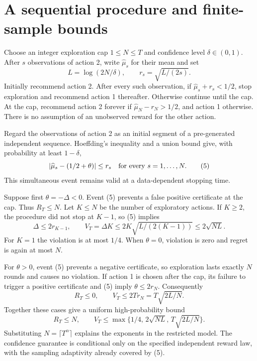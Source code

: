 \documentclass[11pt]{article}
\begin{document}
\section*{A sequential procedure and finite-sample bounds}
Choose an integer exploration cap $1\leq N\leq T$ and confidence level
$\delta\in(0,1)$. After $s$ observations of action 2, write
$\widehat\mu_s$ for their mean and set
\[
 L=\log(2N/\delta),\qquad r_s=\sqrt{L/(2s)}.
\]
Initially recommend action 2. After every such observation, if
$\widehat\mu_s+r_s<1/2$, stop exploration and recommend action 1
thereafter. Otherwise continue until the cap. At the cap, recommend
action 2 forever if $\widehat\mu_N-r_N>1/2$, and action 1 otherwise.
There is no assumption of an unobserved reward for the other action.

Regard the observations of action 2 as an initial segment of a
pre-generated independent sequence. Hoeffding's inequality and a union
bound give, with probability at least $1-\delta$,
\[
 |\widehat\mu_s-(1/2+\theta)|\leq r_s
 \quad\hbox{for every }s=1,\ldots,N.
 \tag{5}
\]
This simultaneous event remains valid at a data-dependent stopping time.

Suppose first $\theta=-\Delta<0$. Event (5) prevents a false positive
certificate at the cap. Thus $R_T\leq N$. Let $K\leq N$ be the number
of exploratory actions. If $K\geq2$, the procedure did not stop at
$K-1$, so (5) implies
\[
 \Delta\leq2r_{K-1},\qquad
 V_T=\Delta K\leq2K\sqrt{L/(2(K-1))}
 \leq2\sqrt{NL}.
 \tag{6}
\]
For $K=1$ the violation is at most $1/4$. When $\theta=0$, violation
is zero and regret is again at most $N$.

For $\theta>0$, event (5) prevents a negative certificate, so exploration
lasts exactly $N$ rounds and causes no violation. If action 1 is chosen
after the cap, its failure to trigger a positive certificate and (5)
imply $\theta\leq2r_N$. Consequently
\[
 R_T\leq0,\qquad V_T\leq2Tr_N=T\sqrt{2L/N}.
 \tag{7}
\]
Together these cases give a uniform high-probability bound
\[
 R_T\leq N,\qquad
 V_T\leq\max\{1/4,\,2\sqrt{NL},\,T\sqrt{2L/N}\}.
 \tag{8}
\]
Substituting $N=\lceil T^\alpha\rceil$ explains the exponents in the
restricted model. The confidence guarantee is conditional only on
the specified independent reward law, with the sampling adaptivity
already covered by (5).
\end{document}
